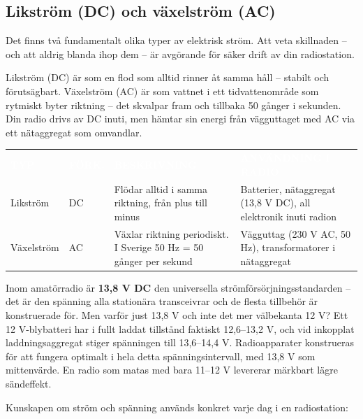 \documentclass[a4paper,11pt,twoside]{book}
\newcommand{\emoji}[1]{{\emojifont #1}}
\newcommand{\tblhdr}[1]{\cellcolor{greydark}\textcolor{white}{\headingfont\bfseries\footnotesize\MakeUppercase{#1}}}
\begin{document}
\subsection{Likström (DC) och växelström (AC)}

Det finns två fundamentalt olika typer av elektrisk ström. Att veta skillnaden – och att aldrig blanda ihop dem – är avgörande för säker drift av din radiostation.

\begin{examplebox}[title={\emoji{💧} DC och AC i vattenanalogin}]
Likström (DC) är som en flod som alltid rinner åt samma håll – stabilt och förutsägbart. Växelström (AC) är som vattnet i ett tidvattenområde som rytmiskt byter riktning – det skvalpar fram och tillbaka 50 gånger i sekunden. Din radio drivs av DC inuti, men hämtar sin energi från vägguttaget med AC via ett nätaggregat som omvandlar.
\end{examplebox}

\begin{center}
\begin{tabular}{L{2cm}L{1.5cm}L{4.5cm}L{4.5cm}}
\tblhdr{Typ} & \tblhdr{Förk.} & \tblhdr{Beskrivning} & \tblhdr{Användning i radio} \\
Likström & DC & Flödar alltid i samma riktning, från plus till minus & Batterier, nätaggregat (13,8 V DC), all elektronik inuti radion \\
Växelström & AC & Växlar riktning periodiskt. I Sverige 50 Hz = 50 gånger per sekund & Vägguttag (230 V AC, 50 Hz), transformatorer i nätaggregat \\
\end{tabular}
\end{center}

Inom amatörradio är \textbf{13,8 V DC} den universella strömförsörjningsstandarden –
det är den spänning alla stationära transceivrar och de flesta tillbehör är konstruerade
för. Men varför just 13,8 V och inte det mer välbekanta 12 V? Ett 12 V-blybatteri har
i fullt laddat tillstånd faktiskt 12,6–13,2 V, och vid inkopplat laddningsaggregat
stiger spänningen till 13,6–14,4 V. Radioapparater konstrueras för att fungera optimalt
i hela detta spänningsintervall, med 13,8 V som mittenvärde. En radio som matas med
bara 11–12 V levererar märkbart lägre sändeffekt.

Kunskapen om ström och spänning används konkret varje dag i en 
radiostation:
\end{document}
